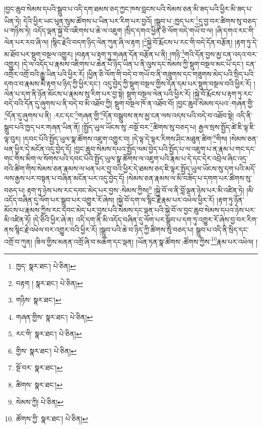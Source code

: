།བྱང་ཆུབ་སེམས་དཔའི་སྒྲུབ་པ་འདི་དག་ཐམས་ཅད་ཀྱང་ཁས་བླངས་པའི་སེམས་ཅན་མི་ཟད་པའི་ཕྱིར་མི་ཟད་པ་ཡིན་ཏེ། དེའི་ཕྱིར་ཡང་ཕུན་སུམ་ཚོགས་པ་ཡིན་པར་རིག་པར་བྱའོ། །སྒྲུབ་པ་:ཁྱད་པར་\footnote{ཁྱད་  སྣར་ཐང་།  པེ་ཅིན། }དུ་བྱ་བར་ཚིགས་སུ་བཅད་པ་གཉིས་ཏེ། འདོད་ལྡན་སྐྱེ་བོ་འཇིགས་པ་ཆེ་ལ་འཇུག །སྲིད་དགའ་ཕྱིན་ཅི་ལོག་བདེ་གཡོ་བ་ལ། །ཞི་དགའ་རང་གི་ལེན་པར་རབ་ཞི་ལ། །སྙིང་རྗེའི་བདག་ཉིད་ལེན་ཀུན་ཞི་ལ་རྟག །\footnote{བརྟག །  སྣར་ཐང་།  པེ་ཅིན། }སྐྱེ་བོ་རྨོངས་པ་རང་གི་བདེ་དོན་བརྩོན། །རྟག་ཏུ་དེ་མ་ཐོབ་པར་སྡུག་བསྔལ་འགྱུར། །བརྟན་པ་རྟག་ཏུ་གཞན་དོན་བརྩོན་པ་ནི། །གཉི་\footnote{གཉིས་  སྣར་ཐང་། }གའི་དོན་བྱས་མྱ་ངན་འདའ་བར་འགྱུར། །དེ་ལ་འདོད་པ་རྣམས་འཇིགས་པ་ཆེན་པོ་ཉིད་ཡིན་པ་ནི་ལུས་དང་སེམས་ཀྱི་སྡུག་བསྔལ་མང་པོ་དང་། ངན་འགྲོར་འགྲོ་བའི་རྒྱུ་ཡིན་པའི་ཕྱིར་རོ། །ཕྱིན་ཅི་ལོག་གི་བདེ་བ་གཡོ་བ་ནི་གཟུགས་དང་གཟུགས་མེད་པའི་སྲིད་པའི་དགའ་བ་རྣམས་མི་རྟག་པ་ཉིད་ཀྱི་ཕྱིར་དང་། འདུ་བྱེད་ཀྱི་སྡུག་བསྔལ་གྱིས་དོན་དམ་པར་སྡུག་བསྔལ་བའི་ཕྱིར་རོ། །ལེན་པ་དག་ནི་ཉོན་མོངས་པ་རྣམས་སུ་རིག་པར་བྱ་སྟེ། སྡུག་བསྔལ་ལེན་པའི་ཕྱིར་རོ། །སྐྱེ་བོ་རྨོངས་པ་རྟག་ཏུ་རང་བདེ་བའི་དོན་དུ་ཞུགས་པ་ནི་བདེ་བ་མི་འཐོབ་ཀྱི། སྡུག་བསྔལ་ཁོ་ན་འཐོབ་བོ། །བྱང་ཆུབ་སེམས་དཔའ་:གཞན་གྱི་\footnote{གཞན་གྱིས་  སྣར་ཐང་།  པེ་ཅིན། }དོན་དུ་ཞུགས་པ་ནི། :རང་དང་\footnote{རང་གི་  སྣར་ཐང་།  པེ་ཅིན། }གཞན་གྱི་\footnote{གྱིས་  སྣར་ཐང་།  པེ་ཅིན། }དོན་བསྒྲུབས་ནས་མྱ་ངན་ལས་འདས་པའི་བདེ་བ་འཐོབ་སྟེ། འདི་ནི་སྒྲུབ་པའི་ཁྱད་པར་གཞན་ཡིན་ནོ། །སྤྱོད་ཡུལ་ཡོངས་སུ་:བསྔོ་བར་\footnote{སྔོ་བར་  སྣར་ཐང་། }ཚིགས་སུ་བཅད་པ། རྒྱལ་སྲས་སྤྱོད་ཚེ་ཇི་ལྟ་ཇི་ལྟ་བུར། །དབང་པོའི་སྤྱོད་ཡུལ་སྣ་ཚོགས་འཇུག་འགྱུར་བ། །དེ་ལྟ་དེ་ལྟར་རིགས་ཤིང་མཐུན་ཚིག་\footnote{ཚིགས་  སྣར་ཐང་། }གིས། །སེམས་ཅན་ཕན་ཕྱིར་དེ་མངོན་འདུ་བྱེད་དོ། །བྱང་ཆུབ་སེམས་དཔའ་སྤྱོད་ལམ་བྱེད་པའི་སྤྱོད་པ་ལ་འཇུག་པ་ན་རྣམ་པ་གང་དང་གང་གིས་མིག་ལ་སོགས་པའི་དབང་པོའི་སྤྱོད་ཡུལ་སྣ་ཚོགས་ལ་འཇུག་པའི་རྣམ་པ་དེ་དང་དེར་འབྲེལ་ཞིང་འདྲ་བའི་ཚིག་གིས་སེམས་ཅན་རྣམས་ལ་ཕན་པར་བྱ་བའི་ཕྱིར་དེ་ཐམས་ཅད་ཇི་ལྟར་སྤྱོད་ཡུལ་ཡོངས་སུ་དག་པའི་མདོ་ལས་རྒྱས་པར་བསྟན་པ་བཞིན་མངོན་པར་འདུ་བྱེད་དོ། །སེམས་ཅན་རྣམས་ལ་མི་བཟོད་པ་དགག་པར་ཚིགས་སུ་བཅད་པ། རྟག་ཏུ་ཉེས་པས་རང་དབང་མེད་པར་བྱས་:སེམས་ཀྱིས།\footnote{སེམས་ཀྱི།  པེ་ཅིན། } །སྐྱེ་བོ་ལ་ནི་བློ་ལྡན་ཉེས་པར་མི་འཛིན་ཏེ། །མི་འདོད་བཞིན་དུ་ལོག་པར་སྒྲུབ་པར་འགྱུར་རོ་ཞེས། །སྐྱེ་བོ་དག་ལ་སྙིང་རྗེ་རྣམ་པར་འཕེལ་ཕྱིར་རོ། །རྟག་ཏུ་ཉོན་མོངས་པ་རྣམས་ཀྱིས་རང་དབང་མེད་པར་བྱས་པའི་སེམས་དང་ལྡན་པའི་སྐྱེ་བོ་ལ་བྱང་ཆུབ་སེམས་དཔའ་ཉེས་པར་མི་འཛིན་ཏོ། །དེ་ཅིའི་ཕྱིར་ཞེ་ན། འདི་དག་ནི་མི་འདོད་བཞིན་དུ་ལོག་པར་སྒྲུབ་པ་དག་ཏུ་འགྱུར་རོ་ཞེས་བྱ་བར་རིག་ནས་སྙིང་རྗེ་འཕེལ་བར་འགྱུར་བའི་ཕྱིར་རོ། །སྒྲུབ་པའི་ཆེ་བ་ཉིད་ཀྱི་ཚིགས་སུ་བཅད་པ། སྒྲུབ་པ་འདི་ནི་སྲིད་དང་འགྲོ་བ་ཀུན། །ཟིལ་གྱིས་མནན་འགྲོ་ཞི་བ་མཆོག་དང་ལྡན། །ཡོན་ཏན་སྣ་ཚོགས་:ཚོགས་ཀྱིས་\footnote{ཚོགས་ཀྱི་  སྣར་ཐང་།  པེ་ཅིན། }རྣམ་པར་འཕེལ། །
